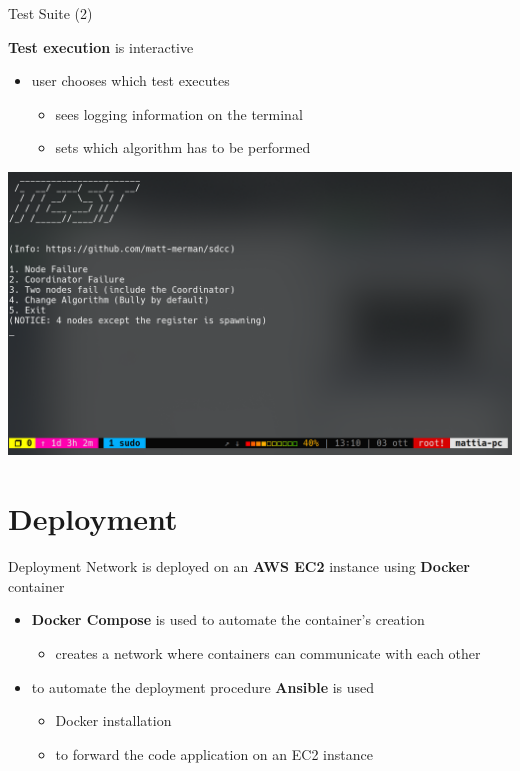 \documentclass{beamer}
\begin{document}
	 \begin{frame}{Test Suite (2)}
	 
	 \textbf{Test execution} is interactive 
	 \begin{itemize}
	     \item user chooses which test executes 
	       \begin{itemize}
	           \item[\ding{113}] sees logging information on the terminal
	           \item[\ding{113}] sets which algorithm has to be performed
	       \end{itemize}
	 \end{itemize}
	 
	 \begin{center}
	  \includegraphics[width=.7\textwidth]{images/tests.png}
	 \end{center}
	 
	 	 
	 \end{frame}
	 
	 \section{Deployment}
	 
	 \begin{frame}{Deployment}
    	Network is deployed on an \textbf{AWS EC2} instance using  \textbf{Docker} container 
    	\begin{itemize}
    	    \item \textbf{Docker Compose} is used to automate the container’s creation
    	    \begin{itemize}
    	        \item[\ding{113}] creates a network where containers can communicate with each other
    	    \end{itemize}
    	    \item to automate the deployment procedure \textbf{Ansible} is used
    	    \begin{itemize}
    	        \item[\ding{113}] Docker installation
    	        \item[\ding{113}] to forward the code application on an EC2 instance
    	    \end{itemize}
    	\end{itemize}
    	\end{frame}
    	
\end{document}
